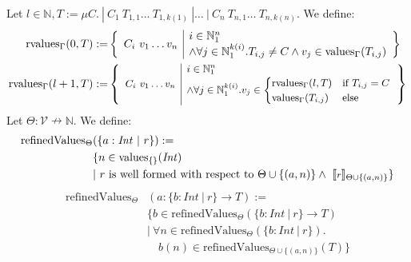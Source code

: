 \documentclass[]{scrbook}
\newcommand{\semantic}[1]{\llbracket \text{\footnotesize\texttt{#1}} \rrbracket}
\theoremstyle{definition}
\theoremstyle{definition}
\theoremstyle{definition}
\theoremstyle{remark}
\begin{document}
Let
\(l\in\mathbb{N},T := \mu C.\ | \ C_1 \ T_{1,1} \dots \ T_{1,k(1)}\ | \dots \ | \ C_n \ T_{n,1} \dots \ T_{n,k(n)}\).
We define: \[
\begin{aligned}
\mathrm{rvalues}_\Gamma(0,T):=&
  \begin{Bmatrix*}[l]
    \begin{array}{l|l}
      C_i \ v_1 \dots v_n
      & \begin{matrix*}[l]
        i\in\mathbb{N}_1^n\\
        \land \forall j\in\mathbb{N}_1^{k(i)}. T_{i,j} \neq C \land v_j \in \mathrm{values}_\Gamma(T_{i,j})
        \end{matrix*}
    \end{array}
  \end{Bmatrix*}\\
\mathrm{rvalues}_\Gamma({l+1},T):=&
  \small\begin{Bmatrix*}[l]
    \begin{array}{l|l}
      C_i \ v_1 \dots v_n
      & \begin{matrix*}[l]
        i\in\mathbb{N}_1^n\\
        \land \forall j\in\mathbb{N}_1^{k(i)}. v_j \in
        \begin{cases}
          \mathrm{rvalues}_\Gamma(l,T)&\text{if } T_{i,j} = C\\
          \mathrm{values}_\Gamma(T_{i,j})&\text{else}
        \end{cases}
        \end{matrix*}
    \end{array}
  \end{Bmatrix*}
\end{aligned} 
\] Let \(\Theta:\mathcal{V}\nrightarrow\mathbb{N}\). We define: \[
\begin{aligned}
\mathrm{refinedValues}_{\Theta}&(\{ a:\mathit{Int} \ | \ r \}) :=\\
   & \{ n\in \mathrm{values}_{\{\}}(\mathit{Int}) \\
  &| \ r \text{ is well formed with respect to }\Theta\cup\{(a,n)\}\land \ \semantic{$r$}_{\Theta\cup\{(a,n)\}} \}\\
\end{aligned}
\] \[
\begin{aligned}
\mathrm{refinedValues}_{\Theta}&(a:\{ b:\mathit{Int} \ | \ r \}\to T) :=\\
   &\{b\in \mathrm{refinedValues}_{\Theta}(\{ b:\mathit{Int} \ | \ r \} \to T)\\
 &| \ \forall n\in \mathrm{refinedValues}_{\Theta}(\{ b:\mathit{Int} \ | \ r \}).\\
     &\quad b(n) \in \mathrm{refinedValues}_{\Theta\cup\{(a,n)\}}(T)\}
\end{aligned}
\]
\end{document}
